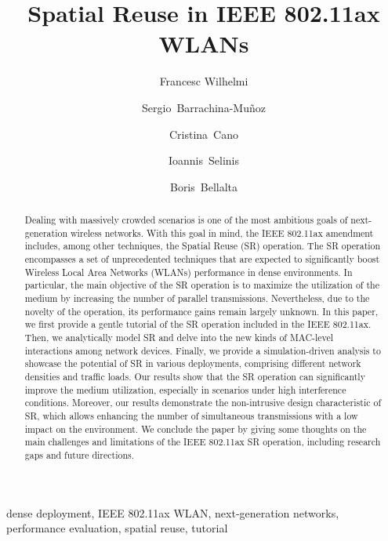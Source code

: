 \documentclass[preprint,12pt]{elsarticle}
\begin{document}
	
\begin{frontmatter}
	
\title{Spatial Reuse in IEEE 802.11ax WLANs}

\author[label1]{Francesc Wilhelmi } %
\author[label1]{Sergio~Barrachina-Mu\~noz}
\author[label2]{Cristina~Cano}
\author[label3]{Ioannis~Selinis}
\author[label1]{Boris~Bellalta}
\address[label1]{Wireless Networking Research Group (WN-UPF), 08002 Barcelona, Spain}
\address[label2]{Wireless Networks Research Group (WINE-UOC), 08860 Barcelona, Spain}
\address[label3]{Institute for Communications Systems (ICS-UoS), GU2 7XH Surrey, United Kingdom}

\begin{abstract}
Dealing with massively crowded scenarios is one of the most ambitious goals of next-generation wireless networks. With this goal in mind, the IEEE 802.11ax amendment includes, among other techniques, the Spatial Reuse (SR) operation. The SR operation encompasses a set of unprecedented techniques {that are expected to significantly boost Wireless Local Area Networks (WLANs) performance in dense environments}. In particular, the main objective of the SR operation is to maximize the utilization of the medium by increasing the number of parallel transmissions. Nevertheless, due to the novelty of the operation, its performance gains remain largely unknown. In this paper, we first provide a gentle tutorial of the SR operation included in the IEEE 802.11ax. Then, we analytically model SR and delve into the new kinds of MAC-level interactions among network devices. Finally, we provide a simulation-driven analysis to showcase the potential of SR in various deployments, comprising different network densities and traffic loads. Our results show that the SR operation can significantly improve the medium utilization, especially in scenarios under high interference conditions. Moreover, our results demonstrate the non-intrusive design characteristic of SR, which allows enhancing the number of simultaneous transmissions with a low impact on the environment. We conclude the paper by giving some thoughts on the main challenges and limitations of the IEEE 802.11ax SR operation, including research gaps and future directions.
\end{abstract}
	
\begin{keyword}
dense deployment, IEEE 802.11ax WLAN, next-generation networks, performance evaluation, spatial reuse, tutorial
\end{keyword}

\end{frontmatter}
		
\end{document}
